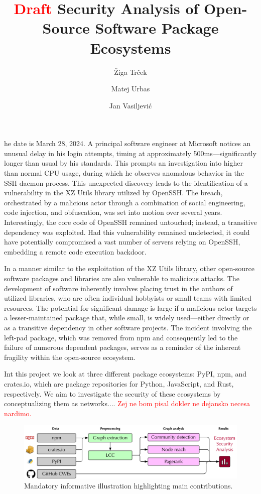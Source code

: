 \documentclass[9pt,twocolumn,twoside]{pnas-report}
\title{\textcolor{red}{Draft} Security Analysis of Open-Source Software Package Ecosystems}
\author[a]{Žiga Trček}
\author[a]{Matej Urbas}
\author[a]{Jan Vasiljević}
\affil[a]{University of Ljubljana, Faculty of Computer and Information Science, Ve\v{c}na pot 113, SI-1000 Ljubljana, Slovenia}
\begin{document}
\maketitle
\thispagestyle{firststyle}

he date is March 28, 2024. A principal software engineer at Microsoft notices an unusual delay in his login attempts, timing at approximately 500ms—significantly longer than usual by his standards. This prompts an investigation into higher than normal CPU usage, during which he observes anomalous behavior in the SSH daemon process. This unexpected discovery leads to the identification of a vulnerability in the XZ Utils library utilized by OpenSSH. The breach, orchestrated by a malicious actor through a combination of social engineering, code injection, and obfuscation, was set into motion over several years. Interestingly, the core code of OpenSSH remained untouched; instead, a transitive dependency was exploited. Had this vulnerability remained undetected, it could have potentially compromised a vast number of servers relying on OpenSSH, embedding a remote code execution backdoor.


In a manner similar to the exploitation of the XZ Utils library, other open-source software packages and libraries are also vulnerable to malicious attacks.
The development of software inherently involves placing trust in the authors of utilized libraries, who are often individual hobbyists or small teams with limited resources.
The potential for significant damage is large if a malicious actor targets a lesser-maintained package that, while small, is widely used—either directly or as a transitive dependency in other software projects.
The incident involving the left-pad package, which was removed from npm and consequently led to the failure of numerous dependent packages, serves as a reminder of the inherent fragility within the open-source ecosystem.

Int this project we look at three different package ecosystems: PyPI, npm, and crates.io, which are package repositories for Python, JavaScript, and Rust, respectively. We aim to investigate the security of these ecosystems by conceptualizing them as networks.... \textcolor{red}{Zej ne bom pisal dokler ne dejansko necesa nardimo.}

\begin{figure}
	\centering
	\includegraphics[width=1\linewidth]{topdown.pdf}
	\caption{Mandatory informative illustration highlighting main contributions.}
	\label{fig:topdown}
\end{figure}
\end{document}
